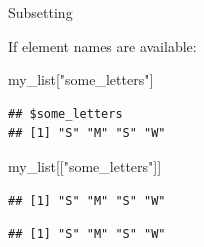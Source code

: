 \documentclass[ignorenonframetext,]{beamer}
\newenvironment{Shaded}{\begin{snugshade}}{\end{snugshade}}
\newcommand{\NormalTok}[1]{#1}
\newcommand{\OperatorTok}[1]{\textcolor[rgb]{0.81,0.36,0.00}{\textbf{#1}}}
\newcommand{\StringTok}[1]{\textcolor[rgb]{0.31,0.60,0.02}{#1}}
\begin{document}
\begin{frame}[fragile]{Subsetting}
\protect\hypertarget{subsetting-3}{}

If element names are available:

\begin{Shaded}
\begin{Highlighting}[]
\NormalTok{my_list[}\StringTok{"some_letters"}\NormalTok{]}
\end{Highlighting}
\end{Shaded}

\begin{verbatim}
## $some_letters
## [1] "S" "M" "S" "W"
\end{verbatim}

\begin{Shaded}
\begin{Highlighting}[]
\NormalTok{my_list[[}\StringTok{"some_letters"}\NormalTok{]]}
\end{Highlighting}
\end{Shaded}

\begin{verbatim}
## [1] "S" "M" "S" "W"
\end{verbatim}

\begin{Shaded}
\end{Shaded}

\begin{verbatim}
## [1] "S" "M" "S" "W"
\end{verbatim}

\end{frame}
\end{document}
